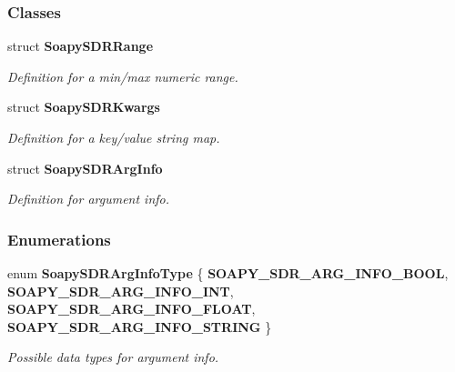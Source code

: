 \subsubsection*{Classes}
\begin{DoxyCompactItemize}
\item 
struct {\bf Soapy\+S\+D\+R\+Range}
\begin{DoxyCompactList}\small\item\em Definition for a min/max numeric range. \end{DoxyCompactList}\item 
struct {\bf Soapy\+S\+D\+R\+Kwargs}
\begin{DoxyCompactList}\small\item\em Definition for a key/value string map. \end{DoxyCompactList}\item 
struct {\bf Soapy\+S\+D\+R\+Arg\+Info}
\begin{DoxyCompactList}\small\item\em Definition for argument info. \end{DoxyCompactList}\end{DoxyCompactItemize}
\subsubsection*{Enumerations}
\begin{DoxyCompactItemize}
\item 
enum {\bf Soapy\+S\+D\+R\+Arg\+Info\+Type} \{ {\bf S\+O\+A\+P\+Y\+\_\+\+S\+D\+R\+\_\+\+A\+R\+G\+\_\+\+I\+N\+F\+O\+\_\+\+B\+O\+OL}, 
{\bf S\+O\+A\+P\+Y\+\_\+\+S\+D\+R\+\_\+\+A\+R\+G\+\_\+\+I\+N\+F\+O\+\_\+\+I\+NT}, 
{\bf S\+O\+A\+P\+Y\+\_\+\+S\+D\+R\+\_\+\+A\+R\+G\+\_\+\+I\+N\+F\+O\+\_\+\+F\+L\+O\+AT}, 
{\bf S\+O\+A\+P\+Y\+\_\+\+S\+D\+R\+\_\+\+A\+R\+G\+\_\+\+I\+N\+F\+O\+\_\+\+S\+T\+R\+I\+NG}
 \}\begin{DoxyCompactList}\small\item\em Possible data types for argument info. \end{DoxyCompactList}
\end{DoxyCompactItemize}

